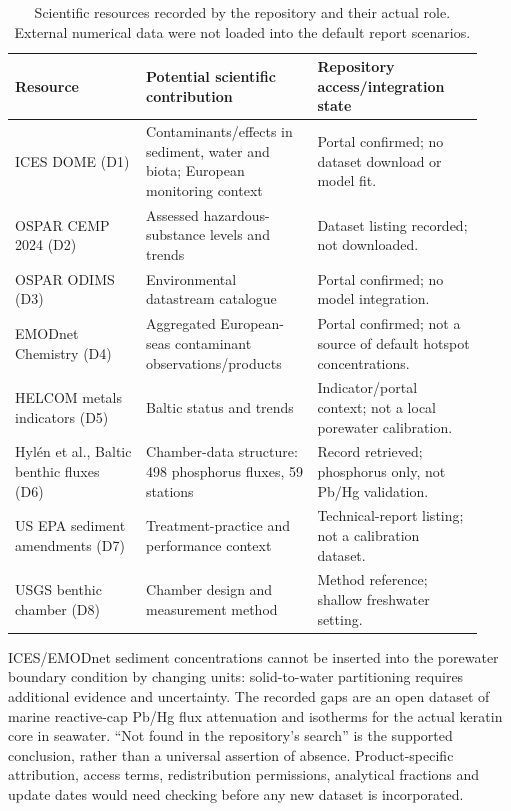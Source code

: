 \begin{table}[htbp]
\centering\small
\setlength{\tabcolsep}{4pt}
\caption{Scientific resources recorded by the repository and their actual role. External numerical data were not loaded into the default report scenarios.}
\label{tab:datasets}
\begin{tabular}{p{0.26\linewidth}p{0.34\linewidth}p{0.33\linewidth}}
\toprule
Resource & Potential scientific contribution & Repository access/integration state \\
\midrule
ICES DOME (D1) & Contaminants/effects in sediment, water and biota; European monitoring context & Portal confirmed; no dataset download or model fit.\cite{icesDome} \\
OSPAR CEMP 2024 (D2) & Assessed hazardous-substance levels and trends & Dataset listing recorded; not downloaded. \\
OSPAR ODIMS (D3) & Environmental datastream catalogue & Portal confirmed; no model integration. \\
EMODnet Chemistry (D4) & Aggregated European-seas contaminant observations/products & Portal confirmed; not a source of default hotspot concentrations.\cite{emodnetChemistry} \\
HELCOM metals indicators (D5) & Baltic status and trends & Indicator/portal context; not a local porewater calibration.\cite{helcomMercury} \\
Hyl\'en et al., Baltic benthic fluxes (D6) & Chamber-data structure: 498 phosphorus fluxes, 59 stations & Record retrieved; phosphorus only, not Pb/Hg validation.\cite{hylen2025} \\
US EPA sediment amendments (D7) & Treatment-practice and performance context & Technical-report listing; not a calibration dataset. \\
USGS benthic chamber (D8) & Chamber design and measurement method & Method reference; shallow freshwater setting.\cite{benthicFluxMonitoring} \\
\bottomrule
\end{tabular}
\end{table}

ICES/EMODnet sediment concentrations cannot be inserted into the porewater boundary condition by changing units: solid-to-water partitioning requires additional evidence and uncertainty. The recorded gaps are an open dataset of marine reactive-cap Pb/Hg flux attenuation and isotherms for the actual keratin core in seawater. ``Not found in the repository's search'' is the supported conclusion, rather than a universal assertion of absence. Product-specific attribution, access terms, redistribution permissions, analytical fractions and update dates would need checking before any new dataset is incorporated.

